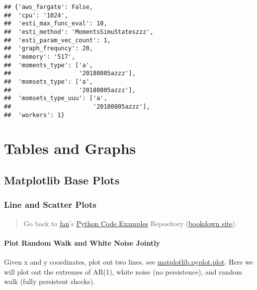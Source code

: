 \documentclass[
]{book}
\begin{document}
\begin{verbatim}
## {'aws_fargate': False,
##  'cpu': '1024',
##  'esti_max_func_eval': 10,
##  'esti_method': 'MomentsSimuStateszzz',
##  'esti_param_vec_count': 1,
##  'graph_frequncy': 20,
##  'memory': '517',
##  'moments_type': ['a',
##                   '20180805azzz'],
##  'momsets_type': ['a',
##                   '20180805azzz'],
##  'momsets_type_uuu': ['a',
##                       '20180805azzz'],
##  'workers': 1}
\end{verbatim}

\hypertarget{tables-and-graphs}{%
\chapter{Tables and Graphs}\label{tables-and-graphs}}

\hypertarget{matplotlib-base-plots}{%
\section{Matplotlib Base Plots}\label{matplotlib-base-plots}}

\hypertarget{line-and-scatter-plots}{%
\subsection{Line and Scatter Plots}\label{line-and-scatter-plots}}

\begin{quote}
Go back to \href{http://fanwangecon.github.io/}{fan}'s \href{https://fanwangecon.github.io/pyfan/}{Python Code Examples} Repository (\href{https://fanwangecon.github.io/pyfan/bookdown}{bookdown site}).
\end{quote}

\hypertarget{plot-random-walk-and-white-noise-jointly}{%
\subsubsection{Plot Random Walk and White Noise Jointly}\label{plot-random-walk-and-white-noise-jointly}}

Given x and y coordinates, plot out two lines. see \href{https://matplotlib.org/2.1.1/api/_as_gen/matplotlib.pyplot.plot.html}{matplotlib.pyplot.plot}. Here we will plot out the extremes of AR(1), white noise (no persistence), and random walk (fully persistent shocks).
\end{document}
